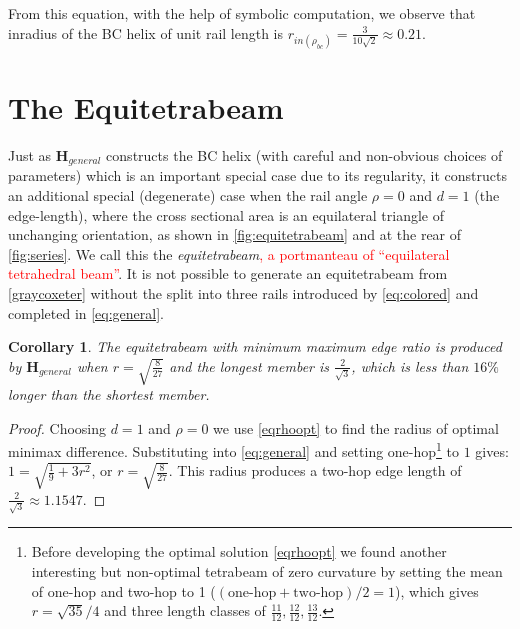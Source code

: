 \documentclass[twocolumn,10pt]{asme2ej}
\newtheorem{corollary}{Corollary}
\renewcommand{\vec}[1]{\mathbf{#1}}
\newcommand{\highlighttext}[1] {\textcolor{red}{#1}}
\begin{document}
From this equation, with the help of symbolic computation, we observe that inradius of the BC helix of unit rail length is $r_{in(\rho_{bc})} = \frac{3}{10\sqrt{2}} \approx 0.21$.

\section{The Equitetrabeam}
\label{sec:equitetrabeam}

Just as $\vec{H}_{general}$ constructs the BC helix (with careful and non-obvious choices of parameters)
which is an important
special case due to its regularity, it constructs an additional special
(degenerate) case when the rail angle $\rho = 0$
and $d = 1$ (the edge-length), where the cross sectional area is
an equilateral triangle of unchanging orientation, as shown in \cref{fig:equitetrabeam} and at the rear of \cref{fig:series}.
We call this the \emph{equitetrabeam}\highlighttext{, a portmanteau of ``equilateral tetrahedral beam''}.
It is not possible to generate an equitetrabeam from 
\cref{graycoxeter}
without the split into three rails introduced by \cref{eq:colored} and completed in  \cref{eq:general}.



\begin{corollary}
  The equitetrabeam with minimum maximum edge ratio is produced
  \newline by $\vec{H}_{general}$ when $ r = \sqrt{\frac{8}{27}} $ and the longest member is $\frac{2}{\sqrt{3}}$,
  which is less than $16\%$ longer
  than the shortest member.
\end{corollary}

\begin{proof}
Choosing $d = 1$ and $\rho = 0$ we use  \cref{eqrhoopt} to find the radius of 
optimal minimax difference. Substituting into  \cref{eq:general} and setting one-hop\footnote{Before developing the optimal solution  \cref{eqrhoopt} we found another interesting but non-optimal tetrabeam of zero curvature
by setting
the mean of one-hop and two-hop to 1 ($(\text{one-hop} + \text{two-hop})/2 = 1$),
  which gives $r = \sqrt{35}/4$ and
  three length classes of $\frac{11}{12}, \frac{12}{12}, \frac{13}{12}$.}
 to $1$
gives:
$ 1  =  \sqrt{\frac{1}{9} + 3r^2} $, or $ r  = \sqrt{\frac{8}{27}}$. This radius
produces a two-hop edge length of $\frac{2}{\sqrt{3}} \approx 1.1547$.
\end{proof}
\end{document}
